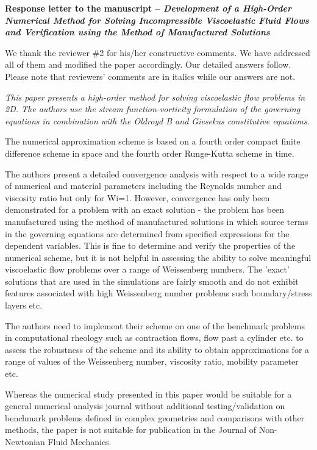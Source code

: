 \documentclass[12pt]{article}
\begin{document}
{\large \textbf{Response letter to the manuscript
-- \emph{Development of a High-Order Numerical Method for Solving Incompressible Viscoelastic Fluid Flows and Verification using the Method of Manufactured Solutions}}}

\vspace{0.8cm}
We thank the reviewer \#2 for his/her constructive comments. We have addressed all of them and modified the paper accordingly. Our detailed answers follow. Please note that reviewers' comments are in italics while our answers are not.
\vspace{0.8cm}

{\it This paper presents a high-order method for solving viscoelastic flow problems in 2D. The authors use the stream function-vorticity formulation of the governing equations in combination with the Oldroyd B and Giesekus constitutive equations.

The numerical approximation scheme is based on a fourth order compact finite difference scheme in space and the fourth order Runge-Kutta scheme in time.

The authors present a detailed convergence analysis with respect to a wide range of numerical and material parameters including the Reynolds number and viscosity ratio but only for Wi=1. However, convergence has only been demonstrated for a problem with an exact solution - the problem has been manufactured using the method of manufactured solutions in which source terms in the governing equations are determined from specified expressions for the dependent variables. This is fine to determine and verify the properties of the numerical scheme, but it is not helpful in assessing the ability to solve meaningful viscoelastic flow problems over a range of Weissenberg numbers. The 'exact' solutions that are used in the simulations are fairly smooth and do not exhibit features associated with high Weissenberg number problems such boundary/stress layers etc.

The authors need to implement their scheme on one of the benchmark problems in computational rheology such as contraction flows, flow past a cylinder etc. to assess the robustness of the scheme and its ability to obtain approximations for a range of values of the Weissenberg number, viscosity ratio, mobility parameter etc.

Whereas the numerical study presented in this paper would be suitable for a general numerical analysis journal without additional testing/validation on benchmark problems defined in complex geometries and comparisons with other methods, the paper is not suitable for publication in the Journal of Non-Newtonian Fluid Mechanics.}
\vspace{3mm}
\end{document}
